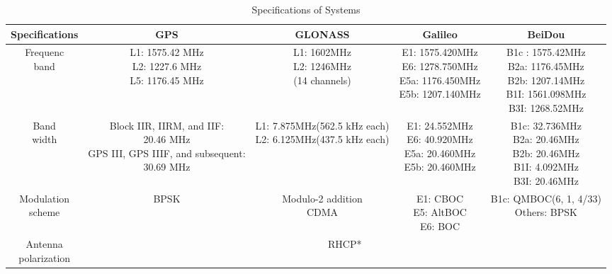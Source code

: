 \begin{landscape}
\begin{center}
\begin{table}
    \centering
    \caption{Specifications of Systems}\label{tab:spec_gnss}
    \begin{tabular}{ccccc}
    \toprule
    Specifications & GPS & GLONASS & Galileo & BeiDou\\
    \midrule
    \thead{Frequenc\\band} & \thead{L1: 1575.42 MHz\\L2: 1227.6 MHz\\L5: 1176.45 MHz} & \thead{L1: 1602MHz\\L2: 1246MHz\\(14 channels)} & \thead{E1: 1575.420MHz\\E6: 1278.750MHz\\E5a: 1176.450MHz\\E5b: 1207.140MHz} & \thead{B1c : 1575.42MHz\\B2a: 1176.45MHz\\B2b: 1207.14MHz\\B1I: 1561.098MHz\\B3I: 1268.52MHz}\\
    \thead{Band\\width} & \thead{Block IIR, IIRM, and IIF:\\20.46 MHz\\GPS III, GPS IIIF, and subsequent:\\30.69 MHz} & \thead{L1: 7.875MHz(562.5 kHz each)\\L2: 6.125MHz(437.5 kHz each)} & \thead{E1: 24.552MHz\\E6: 40.920MHz\\E5a: 20.460MHz\\E5b: 20.460MHz} & \thead{B1c: 32.736MHz\\B2a: 20.46MHz\\B2b: 20.46MHz\\B1I: 4.092MHz\\B3I: 20.46MHz}\\
    \thead{Modulation\\scheme} & BPSK & \thead{Modulo-2 addition\\CDMA}& \thead{E1: CBOC\\E5: AltBOC\\E6: BOC} & \thead{B1c: QMBOC(6, 1, 4/33)\\Others: BPSK}\\
    \thead{Antenna\\polarization} & \multicolumn{4}{c}{RHCP*}\\

\end{tabular}
\end{table}
\end{center}
\end{landscape}
